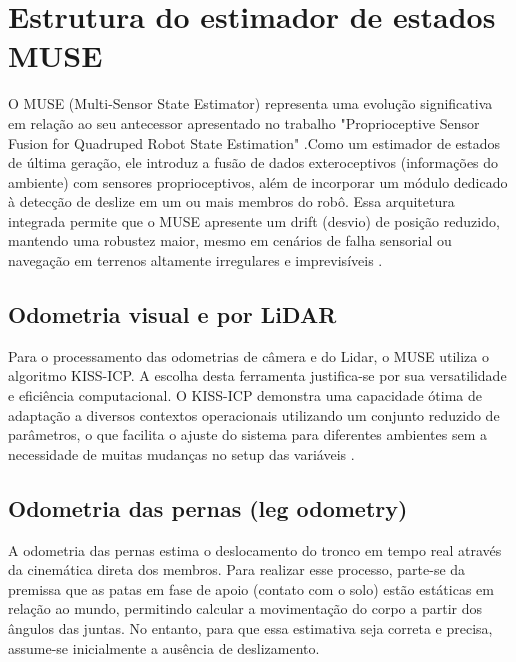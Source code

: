 \section{Estrutura do estimador de estados MUSE}
O MUSE (Multi-Sensor State Estimator) representa uma evolução significativa em relação ao 
seu antecessor apresentado no trabalho "Proprioceptive Sensor Fusion for Quadruped Robot 
State Estimation" \cite{fink2020proprioceptive}.Como um estimador de estados de última geração, 
ele introduz a fusão de dados exteroceptivos (informações do ambiente) com 
sensores proprioceptivos, além de incorporar um módulo dedicado à detecção de 
deslize em um ou mais membros do robô. Essa arquitetura integrada permite que o 
MUSE apresente um drift (desvio) de posição reduzido, mantendo uma robustez 
maior, mesmo em cenários de falha sensorial ou navegação em terrenos altamente 
irregulares e imprevisíveis \cite{nistico2025muse}.

\subsection{Odometria visual e por LiDAR}
Para o processamento das odometrias de câmera e do Lidar, o MUSE utiliza o 
algoritmo KISS-ICP. A escolha desta ferramenta justifica-se por sua versatilidade 
e eficiência computacional. O KISS-ICP demonstra uma capacidade ótima  de 
adaptação a diversos contextos operacionais utilizando um conjunto reduzido de 
parâmetros, o que facilita o ajuste do sistema para diferentes ambientes sem a 
necessidade de muitas mudanças no setup das variáveis \cite{vizzo2023kiss}.

\subsection{Odometria das pernas (leg odometry)}
A odometria das pernas estima o deslocamento do tronco em tempo real através da 
cinemática direta dos membros. Para realizar esse processo, parte-se da premissa 
que as patas em fase de apoio (contato com o solo) estão estáticas em relação ao 
mundo, permitindo calcular a movimentação do corpo a partir dos ângulos das 
juntas. No entanto, para que essa estimativa seja correta e precisa, assume-se 
inicialmente a ausência de deslizamento.

